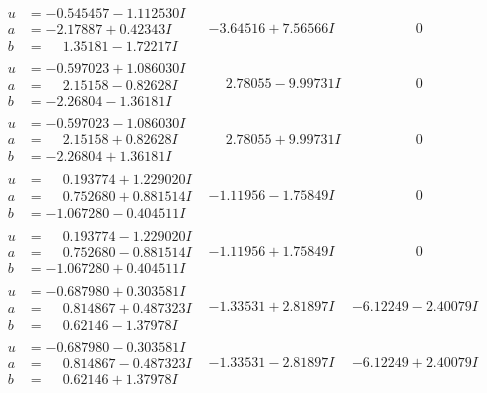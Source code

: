 \documentclass[1p]{elsarticle_modified}
\theoremstyle{definition}
\begin{document}
$$\begin{array}{c|c|c}
\begin{aligned}
u &= -0.545457 - 1.112530 I \\
a &= -2.17887 + 0.42343 I \\
b &= \phantom{-}1.35181 - 1.72217 I\end{aligned}
 & -3.64516 + 7.56566 I & \phantom{-0.000000 } 0 \\ \hline\begin{aligned}
u &= -0.597023 + 1.086030 I \\
a &= \phantom{-}2.15158 - 0.82628 I \\
b &= -2.26804 - 1.36181 I\end{aligned}
 & \phantom{-}2.78055 - 9.99731 I & \phantom{-0.000000 } 0 \\ \hline\begin{aligned}
u &= -0.597023 - 1.086030 I \\
a &= \phantom{-}2.15158 + 0.82628 I \\
b &= -2.26804 + 1.36181 I\end{aligned}
 & \phantom{-}2.78055 + 9.99731 I & \phantom{-0.000000 } 0 \\ \hline\begin{aligned}
u &= \phantom{-}0.193774 + 1.229020 I \\
a &= \phantom{-}0.752680 + 0.881514 I \\
b &= -1.067280 - 0.404511 I\end{aligned}
 & -1.11956 - 1.75849 I & \phantom{-0.000000 } 0 \\ \hline\begin{aligned}
u &= \phantom{-}0.193774 - 1.229020 I \\
a &= \phantom{-}0.752680 - 0.881514 I \\
b &= -1.067280 + 0.404511 I\end{aligned}
 & -1.11956 + 1.75849 I & \phantom{-0.000000 } 0 \\ \hline\begin{aligned}
u &= -0.687980 + 0.303581 I \\
a &= \phantom{-}0.814867 + 0.487323 I \\
b &= \phantom{-}0.62146 - 1.37978 I\end{aligned}
 & -1.33531 + 2.81897 I & -6.12249 - 2.40079 I \\ \hline\begin{aligned}
u &= -0.687980 - 0.303581 I \\
a &= \phantom{-}0.814867 - 0.487323 I \\
b &= \phantom{-}0.62146 + 1.37978 I\end{aligned}
 & -1.33531 - 2.81897 I & -6.12249 + 2.40079 I\\

\end{array}$$
\end{document}
